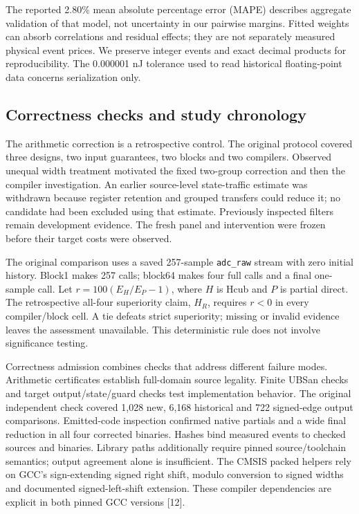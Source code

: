 \documentclass[conference]{IEEEtran}
\begin{document}
The reported 2.80\% mean absolute percentage error (MAPE) describes
aggregate validation of that model, not uncertainty in our pairwise
margins. Fitted weights can absorb correlations and residual effects;
they are not separately measured physical event prices. We preserve
integer events and exact decimal products for reproducibility. The
0.000001 nJ tolerance used to read historical floating-point data
concerns serialization only.

\subsection{Correctness checks and study chronology}\label{correctness-checks-and-study-chronology}

The arithmetic correction is a retrospective control. The original
protocol covered three designs, two input guarantees, two blocks and two
compilers. Observed unequal width treatment motivated the fixed
two-group correction and then the compiler investigation. An earlier
source-level state-traffic estimate was withdrawn because register
retention and grouped transfers could reduce it; no candidate had been
excluded using that estimate. Previously inspected filters remain
development evidence. The fresh panel and intervention were frozen
before their target costs were observed.

The original comparison uses a saved 257-sample \texttt{adc\_raw} stream
with zero initial history. Block1 makes 257 calls; block64 makes four
full calls and a final one-sample call. Let \(r=100(E_H/E_P-1)\), where
\(H\) is Hcub and \(P\) is partial direct. The retrospective all-four
superiority claim, \(H_R\), requires \(r<0\) in every compiler/block
cell. A tie defeats strict superiority; missing or invalid evidence
leaves the assessment unavailable. This deterministic rule does not
involve significance testing.

Correctness admission combines checks that address different failure
modes. Arithmetic certificates establish full-domain source legality.
Finite UBSan checks and target output/state/guard checks test
implementation behavior. The original independent check covered 1,028
new, 6,168 historical and 722 signed-edge output comparisons.
Emitted-code inspection confirmed native partials and a wide final
reduction in all four corrected binaries. Hashes bind measured events to
checked sources and binaries. Library paths additionally require pinned
source/toolchain semantics; output agreement alone is insufficient. The
CMSIS packed helpers rely on GCC's sign-extending signed right shift,
modulo conversion to signed widths and documented signed-left-shift
extension. These compiler dependencies are explicit in both pinned GCC
versions {[}12{]}.
\end{document}
